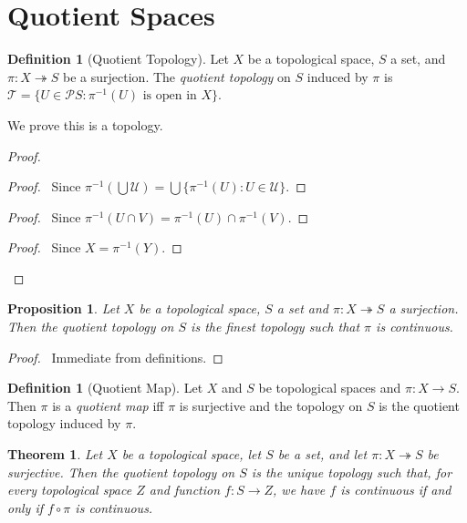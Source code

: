 \documentclass{book}
\let\qed\relax
\newtheorem{prop}[ax]{Proposition}
\newtheorem{thm}[ax]{Theorem}
\theoremstyle{definition}
\newtheorem{df}[ax]{Definition}
\newcommand{\inv}[1]{\ensuremath{{#1}^{-1}}}
\begin{document}
\section{Quotient Spaces}

\begin{df}[Quotient Topology]
Let $X$ be a topological space, $S$ a set, and $\pi : X \twoheadrightarrow S$ be a surjection. The \emph{quotient topology} on $S$ induced by $\pi$ is $\mathcal{T} = \{ U \in \mathcal{P} S : \inv{\pi}(U) \text{ is open in } X \}$.

We prove this is a topology.
\end{df}

\begin{proof}
\pf
{}
\begin{proof}
	\pf\ Since $\inv{\pi}(\bigcup \mathcal{U}) = \bigcup \{ \inv{\pi}(U) : U \in \mathcal{U} \}$.
\end{proof}
\begin{proof}
	\pf\ Since $\inv{\pi}(U \cap V) = \inv{\pi}(U) \cap \inv{\pi}(V)$.
\end{proof}
\begin{proof}
	\pf\ Since $X = \inv{\pi}(Y)$.
\end{proof}
\qed
\end{proof}

\begin{prop}
Let $X$ be a topological space, $S$ a set and $\pi : X \twoheadrightarrow S$ a surjection. Then the quotient topology on $S$ is the finest topology such that $\pi$ is continuous.
\end{prop}

\begin{proof}
\pf\ Immediate from definitions. \qed
\end{proof}

\begin{df}[Quotient Map]
Let $X$ and $S$ be topological spaces and $\pi : X \rightarrow S$. Then $\pi$ is a \emph{quotient map} iff $\pi$ is surjective and the topology on $S$ is the quotient topology induced by $\pi$.
\end{df}

\begin{thm}
Let $X$ be a topological space, let $S$ be a set, and let $\pi : X \twoheadrightarrow S$ be surjective. Then the quotient topology on $S$ is the unique topology such that, for every topological space $Z$ and function $f : S \rightarrow Z$, we have $f$ is continuous if and only if $f \circ \pi$ is continuous.
\end{thm}
\end{document}
